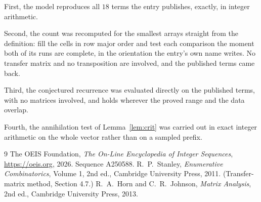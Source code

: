 \documentclass[11pt,a4paper]{article}
\theoremstyle{plain}
\theoremstyle{definition}
\begin{document}
First, the model reproduces all $18$ terms the entry publishes, exactly, in integer
arithmetic.

Second, the count was recomputed for the smallest arrays straight from the definition: fill the
cells in row major order and test each comparison the moment both of its runs are complete,
in the orientation the entry's own name writes. No transfer matrix and no transposition are
involved, and the published terms came back.

Third, the conjectured recurrence was evaluated directly on the published terms, with no
matrices involved, and holds wherever the proved range and the data overlap.

Fourth, the annihilation test of Lemma~\ref{lem:crit} was carried out in exact integer
arithmetic on the whole vector rather than on a sampled prefix.

\begin{thebibliography}{9}
 The OEIS Foundation, \emph{The On-Line Encyclopedia of Integer
Sequences}, \url{https://oeis.org}, 2026. Sequence A250588.
 R.~P.~Stanley, \emph{Enumerative Combinatorics}, Volume 1, 2nd ed.,
Cambridge University Press, 2011. (Transfer-matrix method, Section 4.7.)
 R.~A.~Horn and C.~R.~Johnson, \emph{Matrix Analysis}, 2nd ed., Cambridge
University Press, 2013.
\end{thebibliography}
\end{document}
